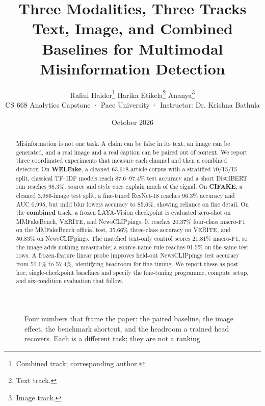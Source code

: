 \documentclass[11pt]{article}
\title{\vspace{-1.2em}\bfseries\LARGE Three Modalities, Three Tracks\\[2pt]
\large Text, Image, and Combined Baselines for Multimodal Misinformation Detection}
\author{
  Rafiul Haider\thanks{Combined track; corresponding author.} \quad
  Harika Etikela\thanks{Text track.} \quad
  Ananya\thanks{Image track.} %
  \\[4pt]
  \small CS 668 Analytics Capstone · Pace University · Instructor: Dr. Krishna Bathula
}
\date{October 2026}
\begin{document}
\maketitle

\begin{abstract}
Misinformation is not one task. A claim can be false in its text, an image can be generated, and a real image and a real caption can be paired out of context. We report three coordinated experiments that measure each channel and then a combined detector. On \textbf{WELFake}, a cleaned 63{,}678-article corpus with a stratified 70/15/15 split, classical TF--IDF models reach 87.6--97.4\% test accuracy and a short DistilBERT run reaches 98.3\%; source and style cues explain much of the signal. On \textbf{CIFAKE}, a cleaned 3{,}986-image test split, a fine-tuned ResNet-18 reaches 96.3\% accuracy and AUC 0.995, but mild blur lowers accuracy to 85.6\%, showing reliance on fine detail. On the \textbf{combined} track, a frozen LAYA-Vision checkpoint is evaluated zero-shot on MMFakeBench, VERITE, and NewsCLIPpings. It reaches 20.37\% four-class macro-F1 on the MMFakeBench official test, 35.66\% three-class accuracy on VERITE, and 50.83\% on NewsCLIPpings. The matched text-only control scores 21.81\% macro-F1, so the image adds nothing measurable; a source-name rule reaches 91.5\% on the same test rows. A frozen-feature linear probe improves held-out NewsCLIPpings test accuracy from 51.1\% to 57.4\%, identifying headroom for fine-tuning. We report these as post-hoc, single-checkpoint baselines and specify the fine-tuning programme, compute setup, and six-condition evaluation that follow.
\end{abstract}

\begin{figure}[t]
\centering
{}
\caption{Four numbers that frame the paper: the paired baseline, the image effect, the benchmark shortcut, and the headroom a trained head recovers. Each is a different task; they are not a ranking.}
\label{fig:glance}
\end{figure}
\end{document}
